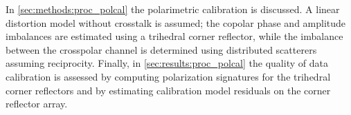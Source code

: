 In \autoref{sec:methods:proc_polcal} the polarimetric calibration is discussed. A linear distortion model without crosstalk is assumed; the copolar phase and amplitude imbalances are estimated using a trihedral corner reflector, while the imbalance between the crosspolar channel is determined using distributed scatterers assuming reciprocity. Finally, in \autoref{sec:results:proc_polcal} the quality of data calibration is assessed by computing polarization signatures for the trihedral corner reflectors and by estimating calibration model residuals on the corner reflector array. 